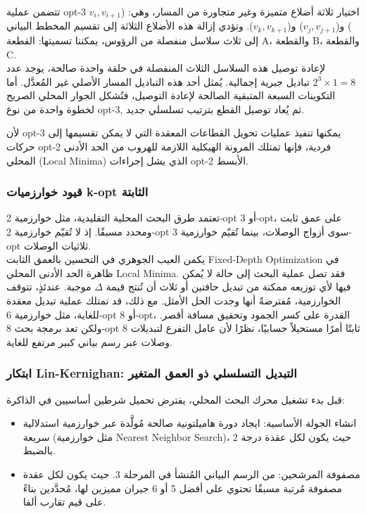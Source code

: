 \documentclass{article}
\newcommand{\en}[1]{\textenglish{#1}}
\begin{document}
تتضمن عملية \en{opt-3} اختيار ثلاثة أضلاع متميزة وغير متجاورة من المسار، وهي: ($v_i, v_{i+1}$) و($v_j, v_{j+1}$) و($v_k, v_{k+1}$). وتؤدي إزالة هذه الأضلاع الثلاثة إلى تقسيم المخطط البياني إلى ثلاث سلاسل منفصلة من الرؤوس، يمكننا تسميتها: القطعة \en{A}، والقطعة \en{B}، والقطعة \en{C}.\\

لإعادة توصيل هذه السلاسل الثلاث المنفصلة في حلقة واحدة صالحة، يوجد عدد $2^3 × 1 = 8$ تباديل جبرية إجمالية. يُمثل أحد هذه التباديل المسار الأصلي غير المُعدَّل. أما التكوينات السبعة المتبقية الصالحة لإعادة التوصيل، فتُشكل الجوار المحلي الصريح لخطوة واحدة من نوع \en{opt-3}, ثم يُعاد توصيل القطع بترتيب تسلسلي جديد.

لأن \en{opt-3} يمكنها تنفيذ عمليات تحويل القطاعات المعقدة التي لا يمكن تقسيمها إلى حركات \en{opt-2} فردية، فإنها تمتلك المرونة الهيكلية اللازمة للهروب من الحد الأدنى المحلي (\en{Local Minima}) الذي يشل إجراءات \en{opt-2} الأبسط.

\subsubsection{قيود خوارزميات k-opt الثابتة}
تعتمد طرق البحث المحلية التقليدية، مثل خوارزمية 2-opt أو 3-opt، على عمق ثابت ومحدد مسبقًا. إذ لا تُقيّم خوارزمية 2-opt سوى أزواج الوصلات، بينما تُقيّم خوارزمية 3-opt ثلاثيات الوصلات.\\

يكمن العيب الجوهري في التحسين بالعمق الثابت \en{Fixed-Depth Optimization} في ظاهرة الحد الأدنى المحلي \en{Local Minima}. فقد تصل عملية البحث إلى حالة لا يُمكن فيها لأي توزيعه ممكنة من تبديل حافتين أو ثلاث أن تُنتج قيمة $\Delta$ موجبة. عندئذٍ، تتوقف الخوارزمية، مُفترضةً أنها وجدت الحل الأمثل. مع ذلك، قد تمتلك عملية تبديل معقدة للغاية، مثل خوارزمية 6-opt أو 8-opt، القدرة على كسر الجمود وتحقيق مسافة أقصر. ولكن تعد برمجة بحث 8-opt ثابتًا أمرًا مستحيلاً حسابيًا، نظرًا لأن عامل التفرع لتبديلات 8 وصلات عبر رسم بياني كبير مرتفع للغاية.

\subsubsection{ابتكار \en{Lin-Kernighan}: التبديل التسلسلي ذو العمق المتغير}
قبل بدء تشغيل محرك البحث المحلي، يفترض تحميل شرطين أساسيين في الذاكرة:

\begin{itemize}
\item
انشاء الجولة الأساسية: ايجاد دورة هاميلتونية صالحة مُولَّدة عبر خوارزمية استدلالية سريعة (مثل خوارزمية \en{Nearest Neighbor Search})، حيث يكون لكل عقدة درجة 2 بالضبط.
\item
مصفوفة المرشحين: من الرسم البياني المُنشأ في المرحلة 3. حيث يكون لكل عقدة مصفوفة مُرتبة مسبقًا تحتوي على أفضل 5 أو 6 جيران مميزين لها، مُحدَّدين بناءً على قيم تقارب ألفا.
\end{itemize}
\end{document}
